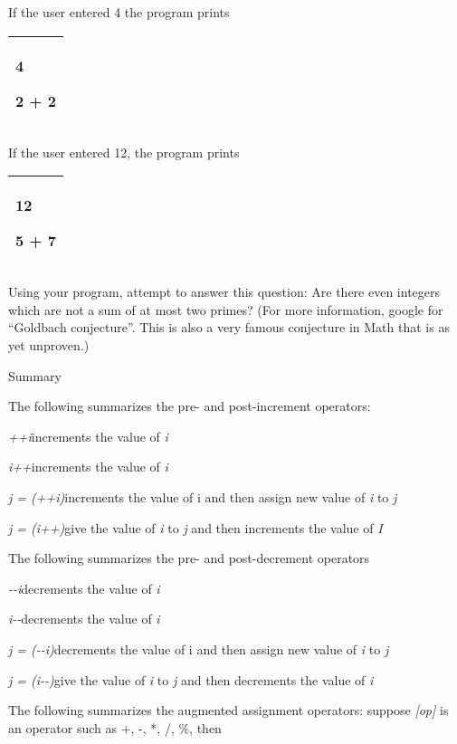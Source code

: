 \documentclass[
]{article}
\begin{document}
If the user entered 4 the program prints

\begin{longtable}[]{@{}l@{}}
\toprule
\endhead
\begin{minipage}[t]{0.97\columnwidth}\raggedright
4

2 + 2\strut
\end{minipage}\tabularnewline
\bottomrule
\end{longtable}

If the user entered 12, the program prints

\begin{longtable}[]{@{}l@{}}
\toprule
\endhead
\begin{minipage}[t]{0.97\columnwidth}\raggedright
12

5 + 7\strut
\end{minipage}\tabularnewline
\bottomrule
\end{longtable}

Using your program, attempt to answer this question: Are there even
integers which are not a sum of at most two primes? (For more
information, google for ``Goldbach conjecture''. This is also a very
famous conjecture in Math that is as yet unproven.)

Summary

The following summarizes the pre- and post-increment operators:

\emph{++i}increments the value of \emph{i}

\emph{i++}increments the value of \emph{i}

\emph{j = (++i)}increments the value of i and then assign new value of
\emph{i} to \emph{j}

\emph{j = (i++)}give the value of \emph{i} to \emph{j} and then
increments the value of \emph{I\\
}

The following summarizes the pre- and post-decrement operators

\emph{-\/-i}decrements the value of \emph{i}

\emph{i-\/-}decrements the value of \emph{i}

\emph{j = (-\/-i)}decrements the value of i and then assign new value of
\emph{i} to \emph{j}

\emph{j = (i-\/-)}give the value of \emph{i} to \emph{j} and then
decrements the value of \emph{i}

The following summarizes the augmented assignment operators: suppose
\emph{{[}op{]}} is an operator such as +, -, *, /, \%, then
\end{document}
